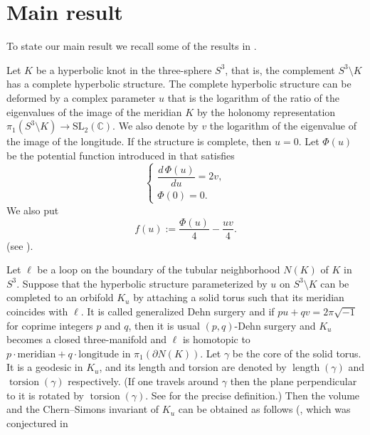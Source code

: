 \documentclass[a4paper]{amsart}
\theoremstyle{plain}
\theoremstyle{definition}
\theoremstyle{remark}
\newcommand{\C}{\mathbb{C}}
\newcommand{\length}{\operatorname{length}}
\newcommand{\torsion}{\operatorname{torsion}}
\numberwithin{equation}{section}
\begin{document}
\section{Main result}
To state our main result we recall some of the results in
\cite{Neumann/Zagier:TOPOL85,Yoshida:INVEM85}.
\par
Let $K$ be a hyperbolic knot in the three-sphere $S^3$, that is, the complement
$S^3\setminus{K}$ has a complete hyperbolic structure.
The complete hyperbolic structure can be deformed by a complex parameter
$u$ that is the logarithm of the ratio of the eigenvalues of the image of the meridian $K$ by the holonomy representation
$\pi_1(S^3\setminus{K})\to\mathrm{SL}_2(\C)$.
We also denote by $v$ the logarithm of the eigenvalue of the image of the
longitude.
If the structure is complete, then $u=0$.
Let $\Phi(u)$ be the potential function introduced in
\cite[Theorem 3]{Neumann/Zagier:TOPOL85} that satisfies
\begin{equation*}
\begin{cases}
  \dfrac{d\,\Phi(u)}{du}=2v,
  \\[3mm]
  \Phi(0)=0.
\end{cases}
\end{equation*}
We also put
\begin{equation*}
  f(u):=\frac{\Phi(u)}{4}-\frac{uv}{4}.
\end{equation*}
(see \cite[Equation (50)]{Neumann/Zagier:TOPOL85}).
\par
Let $\ell$ be a loop on the boundary of the tubular neighborhood
$N(K)$ of $K$ in $S^3$.
Suppose that the hyperbolic structure parameterized by $u$ on $S^3\setminus{K}$
can be completed to an orbifold $K_{u}$ by attaching a solid
torus such that its meridian coincides with $\ell$.
It is called generalized Dehn surgery and if $pu+qv=2\pi\sqrt{-1}$ for
coprime integers $p$ and $q$, then it is usual $(p,q)$-Dehn surgery and
$K_{u}$ becomes a closed three-manifold
\cite[Chapter 4]{Thurston:GT3M} and $\ell$ is homotopic to
$p\cdot\text{meridian}+q\cdot\text{longitude}$ in $\pi_1(\partial{N(K)})$.
Let $\gamma$ be the core of the solid torus.
It is a geodesic in $K_{u}$, and its length and torsion are denoted by
$\length(\gamma)$ and $\torsion(\gamma)$ respectively.
(If one travels around $\gamma$ then the plane perpendicular to it is
rotated by $\torsion(\gamma)$.
See \cite[Definition~1.1]{Yoshida:INVEM85} for the precise definition.)
Then the volume and the Chern--Simons invariant of $K_{u}$ can be obtained
as follows
(\cite[Theorem 2]{Yoshida:INVEM85}, which was conjectured in
\end{document}
